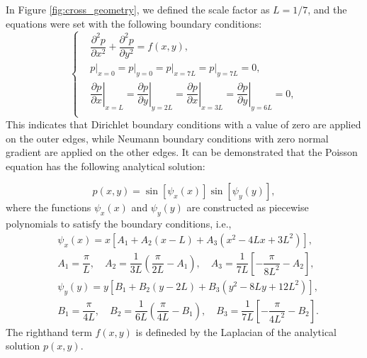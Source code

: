 \documentclass[preprint]{elsarticle}
\begin{document}
In Figure \ref{fig:cross_geometry}, we defined the scale factor as $L=1/7$, and the equations were set with the following boundary conditions:
\begin{equation}
    \label{eq:cross_equation}
    \left\{\begin{aligned}
    &\dfrac{\partial^2p}{\partial x^2}+\dfrac{\partial^2p}{\partial y^2}=f\left(x,y\right),\\%
    &\left.p\right|_{x=0}=\left.p\right|_{y=0}=\left.p\right|_{x=7L}=\left.p\right|_{y=7L}=0,\\
    &\left.\dfrac{\partial p}{\partial x}\right|_{x=L}=\left.\dfrac{\partial p}{\partial y}\right|_{y=2L}=\left.\dfrac{\partial p}{\partial x}\right|_{x=3L}=\left.\dfrac{\partial p}{\partial y}\right|_{y=6L}=0,\\
    \end{aligned}\right.
\end{equation}
This indicates that Dirichlet boundary conditions with a value of zero are applied on the outer edges, while Neumann boundary conditions with zero normal gradient are applied on the other edges. It can be demonstrated that the Poisson equation has the following analytical solution:

\begin{equation}
    \label{eq:cross_analytical_solultion}
    p\left(x,y\right)=\sin\left[\psi_x\left(x\right)\right]\sin\left[\psi_y\left(y\right)\right],
\end{equation}
where the functions $\psi_x(x)$ and $\psi_y(y)$ are constructed as piecewise polynomials to satisfy the boundary conditions, i.e.,
\begin{equation}
    \label{eq:cross_ana_sol_psi}
    \begin{aligned}
        &\psi_x\left(x\right)=x\left[A_1+A_2\left(x-L\right)+A_3\left(x^2-4Lx+3L^2\right)\right],\\
        &A_1=\dfrac{\pi}{L},\quad A_2=\dfrac{1}{3L}\left(\dfrac{\pi}{2L}-A_1\right),\quad A_3=\dfrac{1}{7L}\left[-\dfrac{\pi}{8L^2}-A_2\right],\\
        &\psi_y\left(y\right)=y\left[B_1+B_2\left(y-2L\right)+B_3\left(y^2-8Ly+12L^2\right)\right],\\
        &B_1=\dfrac{\pi}{4L},\quad B_2=\dfrac{1}{6L}\left(\dfrac{\pi}{4L}-B_1\right),\quad B_3=\dfrac{1}{7L}\left[-\dfrac{\pi}{4L^2}-B_2\right].
    \end{aligned}
\end{equation}
The righthand term $f\left(x,y\right)$ is defineded by the Laplacian of the analytical solution $p\left(x,y\right)$.\par
\end{document}
